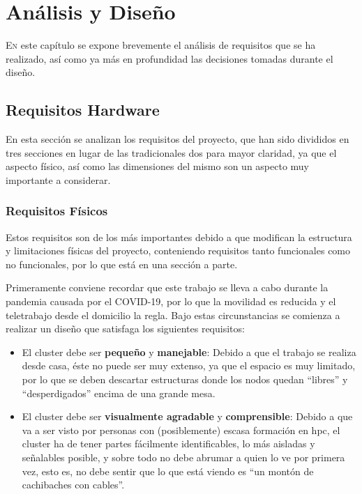 \chapter{Análisis y Diseño}
\label{chap:analisis_diseño}

\lettrine{E}{n} este capítulo se expone brevemente el análisis de requisitos que se ha realizado, así como ya más en profundidad las decisiones tomadas durante el diseño.

\section{Requisitos Hardware}
\label{sec:requisitos_hardware}
En esta sección se analizan los requisitos del proyecto, que han sido divididos en tres secciones en lugar de las tradicionales dos para mayor claridad, ya que el aspecto físico, así como las dimensiones del mismo son un aspecto muy importante a considerar.

\subsection{Requisitos Físicos}
Estos requisitos son de los más importantes debido a que modifican la estructura y limitaciones físicas del proyecto, conteniendo requisitos tanto funcionales como no funcionales, por lo que está en una sección a parte.

Primeramente conviene recordar que este trabajo se lleva a cabo durante la pandemia causada por el COVID-19, por lo que la movilidad es reducida y el teletrabajo desde el domicilio la regla. Bajo estas circunstancias se comienza a realizar un diseño que satisfaga los siguientes requisitos:
\begin{itemize}
    \item El cluster debe ser \textbf{pequeño} y \textbf{manejable}: Debido a que el trabajo se realiza desde casa, éste no puede ser muy extenso, ya que el espacio es muy limitado, por lo que se deben descartar estructuras donde los nodos quedan ``libres'' y ``desperdigados'' encima de una grande mesa.
    \item El cluster debe ser \textbf{visualmente agradable} y \textbf{comprensible}: Debido a que va a ser visto por personas con (posiblemente) escasa formación en \acrshort{hpc}, el cluster ha de tener partes fácilmente identificables, lo más aisladas y señalables posible, y sobre todo no debe abrumar a quien lo ve por primera vez, esto es, no debe sentir que lo que está viendo es ``un montón de cachibaches con cables''.
\end{itemize}

